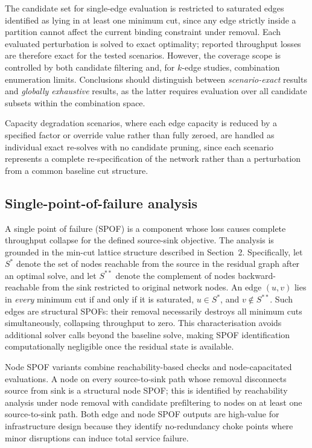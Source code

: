 \documentclass[12pt]{report}
\begin{document}
The candidate set for single-edge evaluation is restricted to saturated edges identified as lying in at least one minimum cut, since any edge strictly inside a partition cannot affect the current binding constraint under removal. Each evaluated perturbation is solved to exact optimality; reported throughput losses are therefore exact for the tested scenarios. However, the coverage scope is controlled by both candidate filtering and, for $k$-edge studies, combination enumeration limits. Conclusions should distinguish between \emph{scenario-exact} results and \emph{globally exhaustive} results, as the latter requires evaluation over all candidate subsets within the combination space.

Capacity degradation scenarios, where each edge capacity is reduced by a specified factor or override value rather than fully zeroed, are handled as individual exact re-solves with no candidate pruning, since each scenario represents a complete re-specification of the network rather than a perturbation from a common baseline cut structure.

\subsection{Single-point-of-failure analysis}

A single point of failure (SPOF) is a component whose loss causes complete throughput collapse for the defined source-sink objective. The analysis is grounded in the min-cut lattice structure described in Section~2. Specifically, let $S^*$ denote the set of nodes reachable from the source in the residual graph after an optimal solve, and let $S^{**}$ denote the complement of nodes backward-reachable from the sink restricted to original network nodes. An edge $(u,v)$ lies in \emph{every} minimum cut if and only if it is saturated, $u\in S^*$, and $v\notin S^{**}$. Such edges are structural SPOFs: their removal necessarily destroys all minimum cuts simultaneously, collapsing throughput to zero. This characterisation avoids additional solver calls beyond the baseline solve, making SPOF identification computationally negligible once the residual state is available.

Node SPOF variants combine reachability-based checks and node-capacitated evaluations. A node on every source-to-sink path whose removal disconnects source from sink is a structural node SPOF; this is identified by reachability analysis under node removal with candidate prefiltering to nodes on at least one source-to-sink path. Both edge and node SPOF outputs are high-value for infrastructure design because they identify no-redundancy choke points where minor disruptions can induce total service failure.
\end{document}
